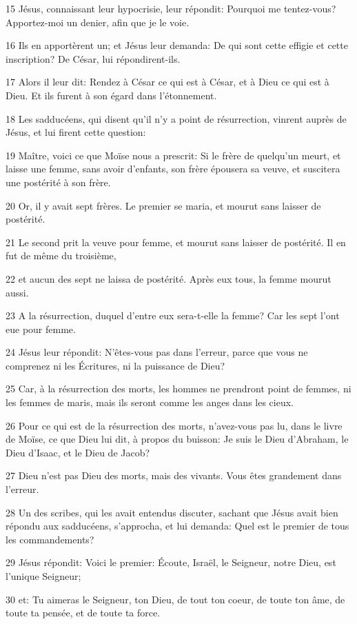 \par 15 Jésus, connaissant leur hypocrisie, leur répondit: Pourquoi me tentez-vous? Apportez-moi un denier, afin que je le voie.
\par 16 Ils en apportèrent un; et Jésus leur demanda: De qui sont cette effigie et cette inscription? De César, lui répondirent-ils.
\par 17 Alors il leur dit: Rendez à César ce qui est à César, et à Dieu ce qui est à Dieu. Et ils furent à son égard dans l'étonnement.
\par 18 Les sadducéens, qui disent qu'il n'y a point de résurrection, vinrent auprès de Jésus, et lui firent cette question:
\par 19 Maître, voici ce que Moïse nous a prescrit: Si le frère de quelqu'un meurt, et laisse une femme, sans avoir d'enfants, son frère épousera sa veuve, et suscitera une postérité à son frère.
\par 20 Or, il y avait sept frères. Le premier se maria, et mourut sans laisser de postérité.
\par 21 Le second prit la veuve pour femme, et mourut sans laisser de postérité. Il en fut de même du troisième,
\par 22 et aucun des sept ne laissa de postérité. Après eux tous, la femme mourut aussi.
\par 23 A la résurrection, duquel d'entre eux sera-t-elle la femme? Car les sept l'ont eue pour femme.
\par 24 Jésus leur répondit: N'êtes-vous pas dans l'erreur, parce que vous ne comprenez ni les Écritures, ni la puissance de Dieu?
\par 25 Car, à la résurrection des morts, les hommes ne prendront point de femmes, ni les femmes de maris, mais ils seront comme les anges dans les cieux.
\par 26 Pour ce qui est de la résurrection des morts, n'avez-vous pas lu, dans le livre de Moïse, ce que Dieu lui dit, à propos du buisson: Je suis le Dieu d'Abraham, le Dieu d'Isaac, et le Dieu de Jacob?
\par 27 Dieu n'est pas Dieu des morts, mais des vivants. Vous êtes grandement dans l'erreur.
\par 28 Un des scribes, qui les avait entendus discuter, sachant que Jésus avait bien répondu aux sadducéens, s'approcha, et lui demanda: Quel est le premier de tous les commandements?
\par 29 Jésus répondit: Voici le premier: Écoute, Israël, le Seigneur, notre Dieu, est l'unique Seigneur;
\par 30 et: Tu aimeras le Seigneur, ton Dieu, de tout ton coeur, de toute ton âme, de toute ta pensée, et de toute ta force.
